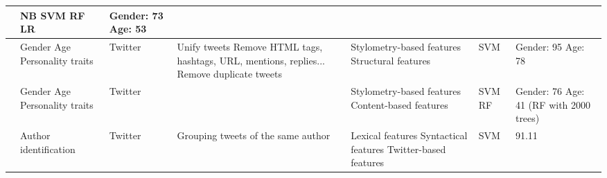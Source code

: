 \begin{longtable}{ p{} p{} p{} p{} p{} p{} p{}}
& \acrshort{NB}
\newline \acrshort{SVM}
\newline \acrshort{RF}
\newline \acrshort{LR}
& Gender: 73
\newline Age: 53
\\
\hline
\cite{grivas2015author} 
& Gender
\newline Age
\newline Personality traits
& Twitter
& Unify tweets
\newline Remove HTML tags, hashtags, URL, mentions, replies...
\newline Remove duplicate tweets
& Stylometry-based features
\newline Structural features
& \acrshort{SVM}
& Gender: 95
\newline Age: 78
\\
\hline
\cite{bartoli2015author} 
& Gender
\newline Age
\newline Personality traits
& Twitter
&
& Stylometry-based features
\newline Content-based features
& \acrshort{SVM}
\newline \acrshort{RF}
& Gender: 76 
\newline Age: 41 (\acrshort{RF} with 2000 trees)
\\
\hline
\cite{bhargava2013stylometric} 
& Author identification
& Twitter
& Grouping tweets of the same author
& Lexical features
\newline Syntactical features
\newline Twitter-based features
& \acrshort{SVM}
& 91.11
\label{table:SA}
\end{longtable}
\endgroup

